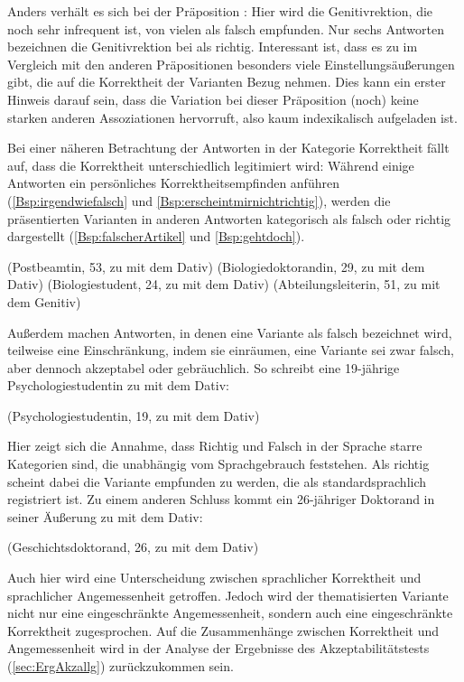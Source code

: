 Anders verhält es sich bei der Präposition \gegenueber{}: 
Hier wird die Genitivrektion, die noch sehr infrequent ist, von vielen als falsch empfunden.
Nur sechs Antworten bezeichnen die Genitivrektion bei \gegenueber{} als richtig. 
Interessant ist, dass es zu \gegenueber{} im Vergleich mit den anderen Präpositionen besonders viele Einstellungsäußerungen gibt, die auf die Korrektheit der Varianten Bezug nehmen. 
Dies kann ein erster Hinweis darauf sein, dass die Variation bei dieser Präposition (noch) keine starken anderen Assoziationen hervorruft, also kaum indexikalisch aufgeladen ist. 

Bei einer näheren Betrachtung der Antworten in der Kategorie \glqq Korrektheit\grqq{} fällt auf, dass die Korrektheit unterschiedlich legitimiert wird: 
Während einige Antworten ein persönliches Korrektheitsempfinden anführen (\autoref{Bsp:irgendwiefalsch} und \autoref{Bsp:erscheintmirnichtrichtig}), werden die präsentierten Varianten in anderen Antworten kategorisch als falsch oder richtig dargestellt (\autoref{Bsp:falscherArtikel} und \autoref{Bsp:gehtdoch}). 
\begin{exe}
\ex {} (Postbeamtin, 53, zu \dank{} mit dem Dativ) \label{Bsp:irgendwiefalsch}
\ex {} (Biologiedoktorandin, 29, zu \dank{} mit dem Dativ) \label{Bsp:erscheintmirnichtrichtig}
\ex {} (Biologiestudent, 24, zu \dank{} mit dem Dativ) \label{Bsp:falscherArtikel}
\ex {} (Abteilungsleiterin, 51, zu \dank{} mit dem Genitiv) \label{Bsp:gehtdoch}
\end{exe}
Außerdem machen Antworten, in denen eine Variante als falsch bezeichnet wird, teilweise eine Einschränkung, indem sie einräumen, eine Variante sei zwar falsch, aber dennoch akzeptabel oder gebräuchlich.
So schreibt eine 19-jährige Psychologiestudentin zu \waehrend{} mit dem Dativ:
\begin{exe}
\ex {} (Psychologiestudentin, 19, zu \waehrend{} mit dem Dativ) \label{Bsp:falschumgangssprachlich}
\end{exe}
Hier zeigt sich die Annahme, dass Richtig und Falsch in der Sprache starre Kategorien sind, die unabhängig vom Sprachgebrauch feststehen. 
Als richtig scheint dabei die Variante empfunden zu werden, die als standardsprachlich registriert ist. 
Zu einem anderen Schluss kommt ein 26-jähriger Doktorand in seiner Äußerung zu \dank{} mit dem Dativ: 
\begin{exe}
\ex {} (Geschichtsdoktorand, 26, zu \dank{} mit dem Dativ)
\end{exe}
Auch hier wird eine Unterscheidung zwischen sprachlicher Korrektheit und sprachlicher Angemessenheit getroffen. 
Jedoch wird der thematisierten Variante nicht nur eine eingeschränkte Angemessenheit, sondern auch eine eingeschränkte Korrektheit zugesprochen. 
Auf die Zusammenhänge zwischen Korrektheit und Angemessenheit wird in der Analyse der Ergebnisse des Akzeptabilitätstests (\autoref{sec:ErgAkzallg}) zurückzukommen sein. 

